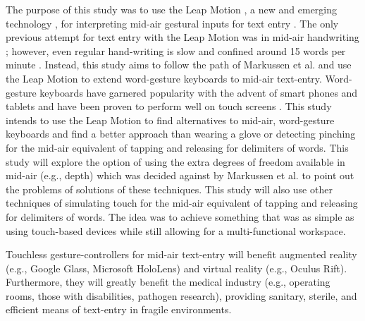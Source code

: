 The purpose of this study was to use the Leap Motion \cite{ref_leap_motion}, a new and emerging technology \cite{ref_leap_painting,ref_leap_device_evaluation_1,ref_leap_device_evaluation_2}, for interpreting mid-air gestural inputs for text entry \cite{ref_leap_tech}. The only previous attempt for text entry with the Leap Motion was in mid-air handwriting \cite{ref_air_handwriting}; however, even regular hand-writing is slow and confined around 15 words per minute \cite{ref_handprinting_alternatives}. Instead, this study aims to follow the path of Markussen et al. \cite{ref_vulture} and use the Leap Motion to extend word-gesture keyboards to mid-air text-entry. Word-gesture keyboards have garnered popularity with the advent of smart phones and tablets and have been proven to perform well on touch screens \cite{ref_shape_writing,ref_the_word_gesture_keyboard,ref_shapewriter_iphone}. This study intends to use the Leap Motion to find alternatives to mid-air, word-gesture keyboards and find a better approach than wearing a glove or detecting pinching \cite{ref_vulture,ref_airstroke} for the mid-air equivalent of tapping and releasing for delimiters of words. This study will explore the option of using the extra degrees of freedom available in mid-air (e.g., depth) which was decided against by Markussen et al. \cite{ref_vulture} to point out the problems of solutions of these techniques. This study will also use other techniques of simulating touch for the mid-air equivalent of tapping and releasing for delimiters of words. The idea was to achieve something that was as simple as using touch-based devices while still allowing for a multi-functional workspace.

Touchless gesture-controllers for mid-air text-entry will benefit augmented reality (e.g., Google Glass, Microsoft HoloLens) and virtual reality (e.g., Oculus Rift). Furthermore, they will greatly benefit the medical industry (e.g., operating rooms, those with disabilities, pathogen research), providing sanitary, sterile, and efficient means of text-entry in fragile environments.

